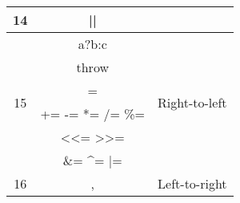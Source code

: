 \begin{center}
\begin{tabular}{|c|c|c|}
		\cline{1-2}
		14					&	\ttfamily ||				&									\\
		\hline
		\multirow{6}{*}{15}	&	\ttfamily a?b:c				&	\multirow{6}{*}{Right-to-left}	\\
							&	\ttfamily throw				&									\\
							&	\ttfamily =					&									\\
							&	\ttfamily += -=	*= /= \%=	&									\\
							&	\ttfamily <<= >>=			&									\\
							&	\ttfamily \&= \^{}= |=		&									\\
		\hline
		16					&	\ttfamily ,					&	Left-to-right					\\
		\hline
	\end{tabular}
\end{center}

